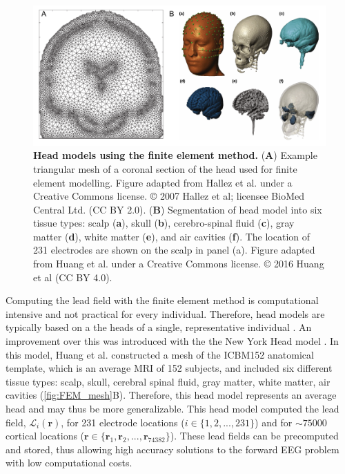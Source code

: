 \begin{figure}[t!]
    \centering
    \includegraphics[width=\textwidth]{Figures/chapter1/FEM_mesh.pdf}
    
    \caption{\textbf{Head models using the finite element method.} 
    (\textbf{A}) Example triangular mesh of a coronal section of the head used for finite element modelling. Figure adapted from Hallez et al. \cite{Hallez2007} under a Creative Commons license. © 2007 Hallez et al; licensee BioMed Central Ltd. (CC BY 2.0).
    (\textbf{B}) Segmentation of head model into six tissue types: scalp (\textbf{a}), skull (\textbf{b}), cerebro-spinal fluid (\textbf{c}), gray matter (\textbf{d}), white matter (\textbf{e}), and air cavities (\textbf{f}). The location of 231 electrodes are shown on the scalp in panel (a). Figure adapted from Huang et al. \cite{Huang2016} under a Creative Commons license. © 2016 Huang et al (CC BY 4.0).
    } 
    \label{fig:FEM_mesh}
\end{figure}

Computing the lead field with the finite element method is computational intensive and not practical for every individual. Therefore, head models are typically based on a the heads of a single, representative individual \cite{Holmes1998}. An improvement over this was introduced with the the New York Head model \cite{Huang2016}. In this model, Huang et al. constructed a mesh of the ICBM152 anatomical template, which is an average MRI of 152 subjects, and included six different tissue types: scalp, skull, cerebral spinal fluid, gray matter, white matter, air cavities (\autoref{fig:FEM_mesh}B). Therefore, this head model represents an average head and may thus be more generalizable.  This head model computed the lead field, $\mathcal{L}_i(\bm{r})$, for 231 electrode locations ($i\in\{1,2,...,231\}$) and for  ${\sim}75000$ cortical locations ($\bm{r}\in\{ \bm{r}_1, \bm{r}_2, ..., \bm{r}_{74382} \}$). These lead fields can be precomputed and stored, thus allowing high accuracy solutions to the forward EEG problem with low computational costs.


